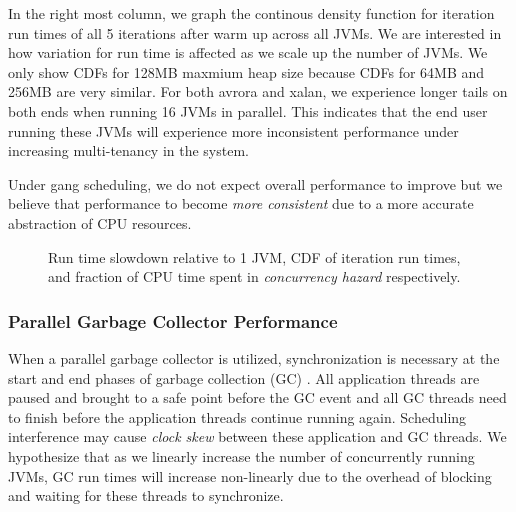 \documentclass{sig-alternate}
\begin{document}
In the right most column, we graph the continous density function for iteration run times of all 5 iterations after warm up across all JVMs. We are interested in how variation for run time is affected as we scale up the number of JVMs. We only show CDFs for 128MB maxmium heap size because CDFs for 64MB and 256MB are very similar. For both avrora and xalan, we experience longer tails on both ends when running 16 JVMs in parallel. This indicates that the end user running these JVMs will experience more inconsistent performance under increasing multi-tenancy in the system. 

Under gang scheduling, we do not expect overall performance to improve but we believe that performance to become \textit{more consistent} due to a more accurate abstraction of CPU resources.

\begin{figure*}
\centering
{}
\caption{Run time slowdown relative to 1 JVM, CDF of iteration run times, and fraction of CPU time spent in \textit{concurrency hazard} respectively.}
\label{fig:overallperf}
\end{figure*}

\subsubsection{Parallel Garbage Collector Performance} \label{sssec:overallperfresults}
When a parallel garbage collector is utilized, synchronization is necessary at the start and end phases of garbage collection (GC) \cite{hotspot:whitepaper}. All application threads are paused and brought to a safe point before the GC event and all GC threads need to finish before the application threads continue running again. Scheduling interference may cause \textit{clock skew} between these application and GC threads. We hypothesize that as we linearly increase the number of concurrently running JVMs, GC run times will increase non-linearly due to the overhead of blocking and waiting for these threads to synchronize.
\end{document}
